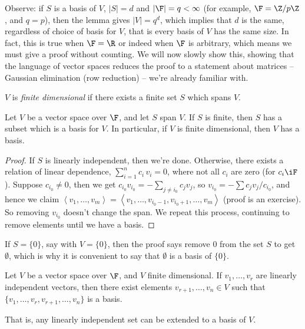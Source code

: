Observe: if $S$ is a basis of $V$,  $\left\vert S \right\vert=d$ and $\left\vert \F \right\vert=q<\infty$ (for example, $\F=\Z/p\Z$, and $q = p$), then the lemma gives $\left\vert V \right\vert=q^d$, which implies that $d$ is the same, regardless of choice of basis for $V$, that is every basis of $V$ has the same size. In fact, this is true when $\F = \R$ or indeed when $\F$ is arbitrary, which means we must give a proof without counting. We will now slowly show this, showing that the language of vector spaces reduces the proof to a statement about matrices -- Gaussian elimination (row reduction) -- we're already familiar with.

\begin{definition}
	$V$ is \emph{finite dimensional} if there exists a finite set $S$ which spans $V$. %
\end{definition}


\begin{theorem}
	Let $V$ be a vector space over $\F$, and let $S$ span $V$. \label{theorem:1-reduce-to-basis} If $S$ is finite, then $S$ has a subset which is a basis for $V$. In particular, if $V$ is finite dimensional, then $V$ has a basis. %
\end{theorem}

\begin{proof}
	If $S$ is linearly independent, then we're done. Otherwise, there exists a relation of linear dependence, $\sum_{i=1}^n c_i \, v_i = 0$, where not all $c_i$ are zero (for $c_i\iF$). Suppose $c_{i_0}\neq 0$, then we get $c_{i_0} v_{i_0} = -\sum_{j\neq i_0} c_j v_{j}$, so $v_{i_0}=-\sum c_j v_j/c_{i_0}$, and hence we claim $\left\langle v_1,\ldots,v_m \right\rangle = \left\langle v_1,\ldots,v_{i_0-1},v_{i_0+1}, \ldots, v_m \right\rangle$ (proof is an exercise). So removing $v_{i_0}$ doesn't change the span. We repeat this process, continuing to remove elements until we have a basis. %
\end{proof}

\vspace{3pt}

\begin{remark}
	If $S=\{0\}$, say with $V=\{0\}$, then the proof says remove $0$ from the set $S$ to get $\emptyset$, which is why it is convenient to say that $\emptyset$ is a basis of $\{0\}$. %
\end{remark}

	\pagebreak

\begin{theorem}
	Let $V$ be a vector space over $\F$, and $V$ finite dimensional. \label{1:theorem-with-lemma} If $v_1,\ldots,v_r$ are linearly independent vectors, then there exist elements $v_{r+1},\ldots,v_n\in V$ such that $\{v_1,\ldots,v_r,v_{r+1},\ldots,v_n\}$ is a basis. %

	That is, any linearly independent set can be extended to a basis of $V$. %
\end{theorem}

